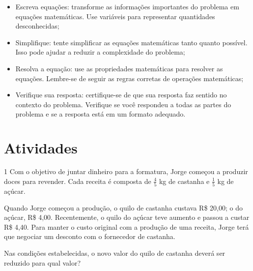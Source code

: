 {\begin{itemize}
  \item Escreva equações: transforme as informações importantes do
problema em equações matemáticas. Use variáveis para representar
quantidades desconhecidas;

  \item Simplifique: tente simplificar as equações matemáticas tanto
quanto possível. Isso pode ajudar a reduzir a complexidade do problema;

  \item Resolva a equação: use as propriedades matemáticas para resolver
as equações. Lembre-se de seguir as regras corretas de operações
matemáticas;

  \item Verifique sua resposta: certifique-se de que sua resposta faz
sentido no contexto do problema. Verifique se você respondeu a todas as
partes do problema e se a resposta está em um formato adequado.
\end{itemize}
}

\section{Atividades}

\num{1} Com o objetivo de juntar dinheiro para a formatura, Jorge começou a
produzir doces para revender. Cada receita é composta de $\frac{4}{5}$ kg de 
castanha e $\frac{1}{5}$ kg de açúcar.

Quando Jorge começou a produção, o quilo de castanha custava R\$ 20,00; o do
açúcar, R\$ 4,00. Recentemente, o quilo do açúcar teve aumento e passou a
custar R\$ 4,40. Para manter o custo original com a produção de uma receita, 
Jorge terá que negociar um desconto com o fornecedor de castanha.

Nas condições estabelecidas, o novo valor do quilo de castanha deverá ser
reduzido para qual valor?

\begin{emptybox}
\end{emptybox}

